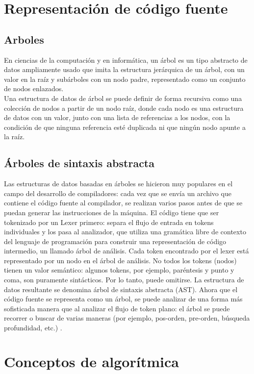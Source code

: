 \section{Representación de código fuente}

\subsection{Arboles}
En ciencias de la computación y en informática, un árbol es un tipo abstracto de datos ampliamente usado que imita la estructura jerárquica de un árbol, con un valor en la raíz y subárboles con un nodo padre, representado como un conjunto de nodos enlazados.\\
Una estructura de datos de árbol se puede definir de forma recursiva como una colección de nodos a partir de un nodo raíz, donde cada nodo es una estructura de datos con un valor, junto con una lista de referencias a los nodos, con la condición de que ninguna referencia esté duplicada ni que ningún nodo apunte a la raíz.

\subsection{Árboles de sintaxis abstracta}
Las estructuras de datos basadas en árboles se hicieron muy populares en el campo del desarrollo de compiladores: cada vez que se envía un archivo que contiene el código fuente al compilador, se realizan varios pasos antes de que se puedan generar las instrucciones de la máquina. El código tiene que ser tokenizado por un Lexer primero: separa el flujo de entrada en tokens individuales y los pasa al analizador, que utiliza una gramática libre de contexto del lenguaje de programación para construir una representación de código intermedio, un llamado árbol de análisis.
Cada token encontrado por el lexer está representado por un nodo en el árbol de análisis. No todos los tokens (nodos) tienen un valor semántico: algunos tokens, por ejemplo, paréntesis y punto y coma, son puramente sintácticos. Por lo tanto, puede omitirse. La estructura de datos resultante se denomina árbol de sintaxis abstracta (AST).
Ahora que el código fuente se representa como un árbol, se puede analizar de una forma más sofisticada manera que al analizar el flujo de token plano: el árbol se puede recorrer o buscar de varias maneras (por ejemplo, pos-orden, pre-orden, búsqueda profundidad, etc.) \cite{ChangeDistiller}.


\section{Conceptos de algorítmica}
